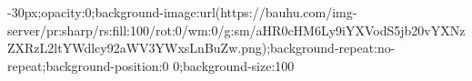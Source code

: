 -30px;opacity:0;background-image:url(https://bauhu.com/img-server/pr:sharp/rs:fill:100/rot:0/wm:0/g:sm/aHR0cHM6Ly9iYXVodS5jb20vYXNzZXRzL2ltYWdlcy92aWV3YWxsLnBuZw.png);background-repeat:no-repeat;background-position:0 0;background-size:100%